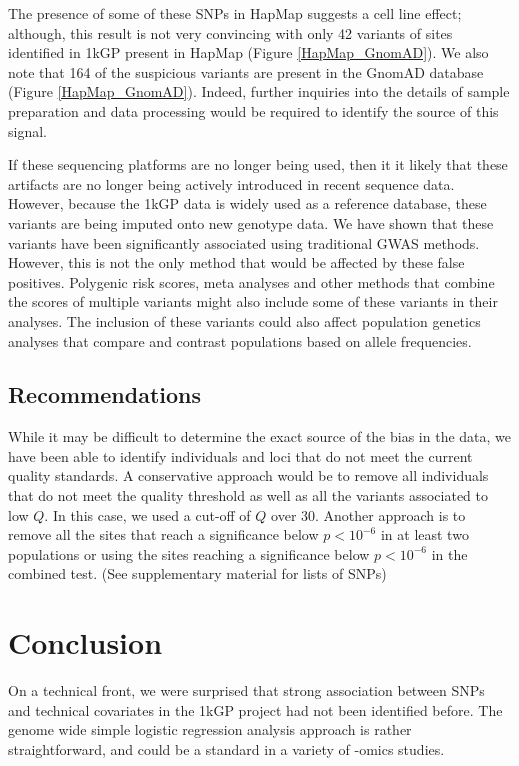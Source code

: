 \documentclass[9pt,lineno]{elife}
\begin{document}
The presence of some of these SNPs in HapMap suggests a cell line effect; although, this result is not very convincing with only 42 variants of sites identified in 1kGP present in HapMap (Figure \ref{HapMap_GnomAD}).
We also note that 164 of the suspicious variants are present in the GnomAD database (Figure \ref{HapMap_GnomAD}).
Indeed, further inquiries into the details of sample preparation and data processing would be required to identify the source of this signal.

If these sequencing platforms are no longer being used, then it it likely that these artifacts are no longer being actively introduced in recent sequence data.
However, because the 1kGP data is widely used as a reference database, these variants are being imputed onto new genotype data.
We have shown that these variants have been significantly associated using traditional GWAS methods.
However, this is not the only method that would be affected by these false positives. 
Polygenic risk scores, meta analyses and other methods that combine the scores of multiple variants might also include some of these variants in their analyses.
The inclusion of these variants could also affect population genetics analyses that compare and contrast populations based on allele frequencies.


\subsection{Recommendations}
While it may be difficult to determine the exact source of the bias in the data, we have been able to identify individuals and loci that do not meet the current quality standards.
A conservative approach would be to remove all individuals that do not meet the quality threshold as well as all the variants associated to low $Q$.
In this case, we used a cut-off of $Q$ over 30.
Another approach is to remove all the sites that reach a significance below $ p < 10^{-6}$ in at least two populations or using the sites reaching a significance below $ p < 10^{-6}$ in the combined test. (See supplementary material for lists of SNPs)

\section{Conclusion}

On a technical front, we were surprised that strong association between SNPs and technical covariates in the 1kGP project had not been identified before. 
The genome wide simple logistic regression analysis approach is rather straightforward, and could be a standard in a variety of -omics studies. 
\end{document}
